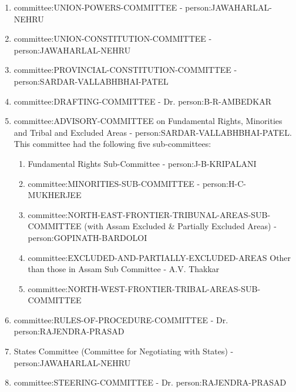 \begin{multicols}{2}
\begin{enumerate}
  \item \gls{committee:UNION-POWERS-COMMITTEE} - \gls{person:JAWAHARLAL-NEHRU}
  \item \gls{committee:UNION-CONSTITUTION-COMMITTEE} - \gls{person:JAWAHARLAL-NEHRU}
  \item \gls{committee:PROVINCIAL-CONSTITUTION-COMMITTEE} - \gls{person:SARDAR-VALLABHBHAI-PATEL}
  \item \gls{committee:DRAFTING-COMMITTEE} - Dr. \gls{person:B-R-AMBEDKAR}
  \item \gls{committee:ADVISORY-COMMITTEE} on Fundamental Rights, Minorities and Tribal and Excluded Areas - \gls{person:SARDAR-VALLABHBHAI-PATEL}. This committee had the following five sub-committees:
  \begin{enumerate}
    \item Fundamental Rights Sub-Committee - \gls{person:J-B-KRIPALANI}
    \item \gls{committee:MINORITIES-SUB-COMMITTEE} - \gls{person:H-C-MUKHERJEE}
    \item \gls{committee:NORTH-EAST-FRONTIER-TRIBUNAL-AREAS-SUB-COMMITTEE} (with Assam Excluded \& Partially Excluded Areas) - \gls{person:GOPINATH-BARDOLOI}
    \item \gls{committee:EXCLUDED-AND-PARTIALLY-EXCLUDED-AREAS} Other than those in Assam Sub Committee - A.V. Thakkar
    \item \gls{committee:NORTH-WEST-FRONTIER-TRIBAL-AREAS-SUB-COMMITTEE}
  \end{enumerate}

  \item \gls{committee:RULES-OF-PROCEDURE-COMMITTEE} - Dr. \gls{person:RAJENDRA-PRASAD}
  \item States Committee (Committee for Negotiating with States) - \gls{person:JAWAHARLAL-NEHRU}
  \item \gls{committee:STEERING-COMMITTEE} - Dr. \gls{person:RAJENDRA-PRASAD}
\end{enumerate}


\end{multicols}
